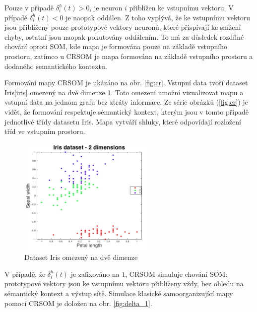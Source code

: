 \documentclass[thesis=M,czech]{FITthesis}[2012/06/26]
\begin{document}
Pouze v případě $ \delta_i^h(t) > 0 $, je neuron $i$ přiblížen ke vstupnímu vektoru. V případě $ \delta_i^h(t) < 0 $ je naopak oddálen. Z toho vyplývá, že ke vstupnímu vektoru jsou přiblíženy pouze prototypové vektory neuronů, které přispívají ke snížení chyby, ostatní jsou naopak pokutovány oddálením. To má za důsledek rozdílné chování oproti SOM, kde mapa je formována pouze na základě vstupního prostoru, zatímco u CRSOM je mapa formována na základě vstupního prostoru a dodaného semantického kontextu. 

Formování mapy CRSOM je ukázáno na obr. \ref{fig:cr}. Vstupní data tvoří dataset Iris\ref{iris} omezený na dvě dimenze \ref{fig:iris2d}. Toto omezení umožní vizualizovat mapu a vstupní data na jednom grafu bez ztráty informace. Ze série obrázků (\ref{fig:cr}) je vidět, že formování respektuje sémantický kontext, kterým jsou v tomto případě jednotlivé třídy datasetu Iris. Mapa vytváří shluky, které odpovídají rozložení tříd ve vstupním prostoru.




\begin{figure}[htp]    
    \centering
    \includegraphics[width=0.6\textwidth]{feature_space_with_classes.png}
    \caption{Dataset Iris omezený na dvě dimenze}
    \label{fig:iris2d}
\end{figure}


V případě, že $ \delta_i^h(t)$ je zafixováno na $1$, CRSOM simuluje chování SOM: prototypové vektory jsou ke vstupnímu vektoru přiblíženy vždy, bez ohledu na sémantický kontext a výstup sítě. Simulace klasické samoorganizující mapy pomocí CRSOM je doložen na obr. \ref{fig:delta_1}.
\end{document}
